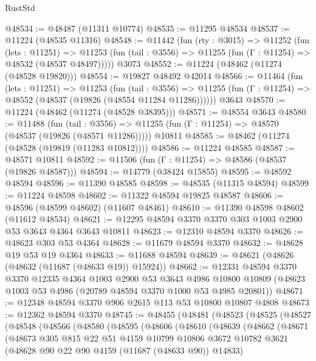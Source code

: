 \begin{lexlean}{RustStd}
\begin{coremodule}
@48534 := @48487 (@11311 @10774)
@48535 := @11295 @48534
@48537 := @11224 (@48535 @11316)
@48548 := @11442
    (fun (rty : @3015) =>
    @11252
      (fun (lets : @11251) =>
      @11253 (fun (tail : @3556) => @11255 (fun (Γ : @11254) => @48532 (@48537 @48497)))))
    @3073
@48552 := @11224 (@48462 (@11274 (@48528 @19820)))
@48554 := @19827 @48492 @42014
@48566 := @11464
    (fun (lets : @11251) =>
    @11253
      (fun (tail : @3556) =>
      @11255 (fun (Γ : @11254) => @48552 (@48537 (@19826 (@48554 @11284 @11286))))))
    @3643
@48570 := @11224 (@48462 (@11274 (@48528 @38395)))
@48571 := @48554 @3643
@48580 := @11488
    (fun (tail : @3556) => @11255 (fun (Γ : @11254) => @48570 (@48537 (@19826 (@48571 @11286)))))
    @10811
@48585 := @48462 (@11274 (@48528 (@19819 (@11283 @10812))))
@48586 := @11224 @48585
@48587 := @48571 @10811
@48592 := @11506 (fun (Γ : @11254) => @48586 (@48537 (@19826 @48587)))
@48594 := @14779 (@38424 @15855)
@48595 := @48592 @48594
@48596 := @11390 @48585
@48598 := @48535 (@11315 @48594)
@48599 := @11224 @48598
@48602 := @11322 @48594 @19825 @48587
@48606 := @48596 (@48599 @48602) (@11607 @48461)
@48610 := @11390 @48598 @48602 (@11612 @48534)
@48621 := @12295 @48594 @3370 @3370 @303 @1003 @2900 @53 @3643 @4364 @3643 @10811
@48623 := @12310 @48594 @3370
@48626 := @48623 @303 @53 @4364
@48628 := @11679 @48594 @3370
@48632 := @48628 @19 @53 @19 @4364
@48633 := @11688 @48594
@48639 := @48621 (@48626 (@48632 (@11687 (@48633 @19)) @15924))
@48662 := @12331
    @48594
    @3370
    @3370
    @12335
    @4364
    @1003
    @2900
    @53
    @3643
    @4986
    @10800
    @10809
    (@48623 @1003 @53 @4986 (@20789 @48594 @3370 @1000 @53 @4985 @20801))
@48671 := @12348 @48594 @3370 @906 @2615 @113 @53 @10800 @10807 @4808
@48673 := @12362 @48594 @3370
@48745 := @48455
    (@48481
      (@48523
        (@48525
          (@48527
            (@48548
              (@48566
                (@48580
                  (@48595
                    (@48606
                      (@48610
                        (@48639
                          (@48662
                            (@48671
                              (@48673
                                @305
                                @815
                                @22
                                @51
                                @4159
                                @10799
                                @10806
                                @3672
                                @10782
                                @3621
                                (@48628 @90 @22 @90 @4159 (@11687 (@48633 @90)) @14833)

\end{coremodule}
\end{lexlean}
